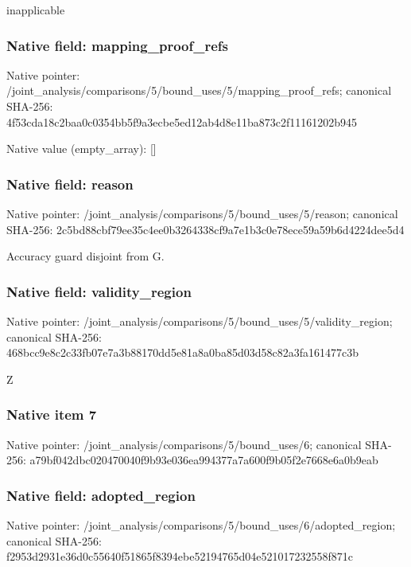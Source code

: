\documentclass[10pt,a4paper]{article}
\begin{document}
\begingroup\raggedright\sloppy inapplicable\par\endgroup

\subsubsection{Native field: mapping\_\allowbreak{}proof\_\allowbreak{}refs}
Native pointer: /joint\_\allowbreak{}analysis/comparisons/5/bound\_\allowbreak{}uses/5/mapping\_\allowbreak{}proof\_\allowbreak{}refs; canonical SHA-256: 4f53cda18c2baa0c0354bb5f9a3ecbe5ed12ab4d8e11ba873c2f11161202b945

Native value (empty\_\allowbreak{}array): []

\subsubsection{Native field: reason}
Native pointer: /joint\_\allowbreak{}analysis/comparisons/5/bound\_\allowbreak{}uses/5/reason; canonical SHA-256: 2c5bd88cbf79ee35c4ee0b3264338cf9a7e1b3c0e78ece59a59b6d4224dee5d4

\begingroup\raggedright\sloppy Accuracy guard disjoint from G.\par\endgroup

\subsubsection{Native field: validity\_\allowbreak{}region}
Native pointer: /joint\_\allowbreak{}analysis/comparisons/5/bound\_\allowbreak{}uses/5/validity\_\allowbreak{}region; canonical SHA-256: 468bcc9e8c2c33fb07e7a3b88170dd5e81a8a0ba85d03d58c82a3fa161477c3b

\begingroup\raggedright\sloppy Z\par\endgroup

\subsubsection{Native item 7}
Native pointer: /joint\_\allowbreak{}analysis/comparisons/5/bound\_\allowbreak{}uses/6; canonical SHA-256: a79bf042dbc020470040f9b93e036ea994377a7a600f9b05f2e7668e6a0b9eab

\subsubsection{Native field: adopted\_\allowbreak{}region}
Native pointer: /joint\_\allowbreak{}analysis/comparisons/5/bound\_\allowbreak{}uses/6/adopted\_\allowbreak{}region; canonical SHA-256: f2953d2931e36d0c55640f51865f8394ebe52194765d04e521017232558f871c
\end{document}
